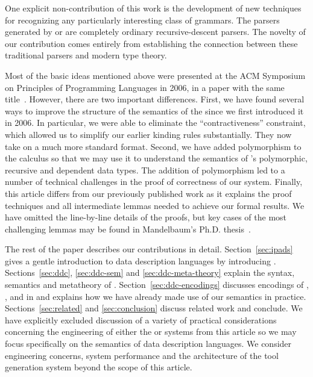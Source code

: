 One explicit non-contribution of this work is the development of new
techniques for recognizing any particularly interesting class of 
grammars.  The parsers generated by \ddc{} or \pads{} are completely ordinary
recursive-descent parsers.  The novelty of our contribution comes entirely
from establishing the connection between these traditional parsers and
modern type theory.

Most of the basic ideas mentioned above were presented at the ACM 
Symposium on Principles of Programming Languages in 2006,
in a paper with the same title~\cite{fisher+:popl06}.  However,
there are two important differences.  First, we have found several 
ways to improve the structure of the semantics of the
\ddc{} since we first introduced it in 2006.  In particular,
we were able to eliminate the ``contractiveness'' constraint, which
allowed us to simplify our earlier kinding rules substantially.  They now 
take on a much more standard format.  Second, we have
added polymorphism to the calculus so that we may use it to understand
the semantics of \padsml{}'s polymorphic, recursive and dependent
data types.  The addition of polymorphism led to
a number of technical challenges in the proof of correctness of our 
system.  Finally, this article differs from our previously published work as
it explains the proof techniques and all intermediate lemmas needed 
to achieve our formal results.  We have omitted the line-by-line 
details of the proofs, but key cases of the most challenging
lemmas may be found in
Mandelbaum's Ph.D. thesis~\cite{mandelbaum:thesis}.

The rest of the paper describes our contributions in detail.
Section~\ref{sec:ipads} gives a gentle introduction to data description
languages by introducing \ipads.  
Sections~\ref{sec:ddc}, \ref{sec:ddc-sem} and \ref{sec:ddc-meta-theory}
explain the syntax, semantics and metatheory of \ddc{}.
Section~\ref{sec:ddc-encodings} discusses encodings of \ipads{},
\padsml{}, \packettypes{}
and \datascript{} in \ddc{} and 
explains how we have already made use of our semantics in practice.  
Sections~\ref{sec:related} and 
\ref{sec:conclusion} discuss related work and conclude.
We have explicitly excluded discussion of a variety of practical 
considerations concerning the engineering of either the \padsc{} or \padsml{}
systems from this article so we may focus specifically on the semantics 
of data description languages.  We consider engineering concerns,
system performance and the architecture of the 
\pads{} tool generation system beyond the scope of this article.

